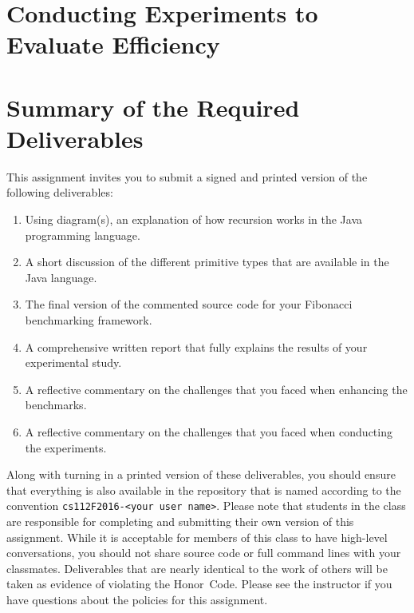 \vspace*{-.05in}
\section*{Conducting Experiments to Evaluate Efficiency}
\vspace*{-.05in}


\section*{Summary of the Required Deliverables}

This assignment invites you to submit a signed and printed version of the following deliverables:

\vspace*{-.1in}
\begin{enumerate}
  \itemsep0pt
  \item Using diagram(s), an explanation of how recursion works in the Java programming language.

  \item A short discussion of the different primitive types that are available in the Java language.

  \item The final version of the commented source code for your Fibonacci benchmarking framework.

  \item A comprehensive written report that fully explains the results of your experimental study.

  \item A reflective commentary on the challenges that you faced when enhancing the benchmarks.

  \item A reflective commentary on the challenges that you faced when conducting the experiments.

\end{enumerate}
\vspace*{-.1in}

Along with turning in a printed version of these deliverables, you should ensure that everything is also available in
the repository that is named according to the convention {\tt cs112F2016-<your user name>}. Please note that students in
the class are responsible for completing and submitting their own version of this assignment. While it is acceptable for
members of this class to have high-level conversations, you should not share source code or full command lines with your
classmates. Deliverables that are nearly identical to the work of others will be taken as evidence of violating the
\mbox{Honor Code}. Please see the instructor if you have questions about the policies for this assignment.


